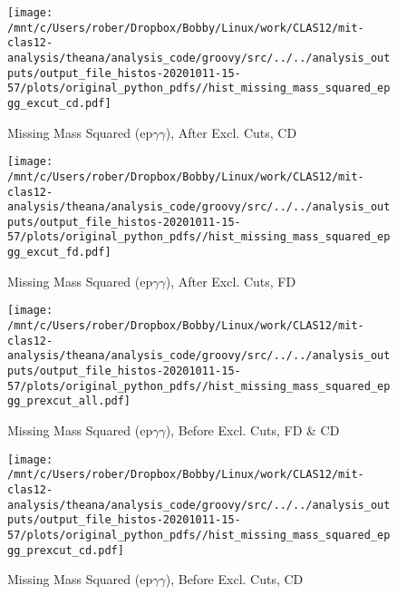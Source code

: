 \documentclass{article}
\begin{document}
\begin{landscape}
    \begin{figure}[h]
        \centering

        \texttt{[image: /mnt/c/Users/rober/Dropbox/Bobby/Linux/work/CLAS12/mit-clas12-analysis/theana/analysis\_code/groovy/src/../../analysis\_outputs/output\_file\_histos-20201011-15-57/plots/original\_python\_pdfs//hist\_missing\_mass\_squared\_epgg\_excut\_cd.pdf]}
        \captionsetup{textformat=empty,labelformat=blank}
        \caption{Missing Mass Squared (ep$\gamma$$\gamma$), After Excl. Cuts, CD}
    \end{figure}
    \clearpage
    
    \begin{figure}[h]
        \centering

        \texttt{[image: /mnt/c/Users/rober/Dropbox/Bobby/Linux/work/CLAS12/mit-clas12-analysis/theana/analysis\_code/groovy/src/../../analysis\_outputs/output\_file\_histos-20201011-15-57/plots/original\_python\_pdfs//hist\_missing\_mass\_squared\_epgg\_excut\_fd.pdf]}
        \captionsetup{textformat=empty,labelformat=blank}
        \caption{Missing Mass Squared (ep$\gamma$$\gamma$), After Excl. Cuts, FD}
    \end{figure}
    \clearpage
    
    \begin{figure}[h]
        \centering

        \texttt{[image: /mnt/c/Users/rober/Dropbox/Bobby/Linux/work/CLAS12/mit-clas12-analysis/theana/analysis\_code/groovy/src/../../analysis\_outputs/output\_file\_histos-20201011-15-57/plots/original\_python\_pdfs//hist\_missing\_mass\_squared\_epgg\_prexcut\_all.pdf]}
        \captionsetup{textformat=empty,labelformat=blank}
        \caption{Missing Mass Squared (ep$\gamma$$\gamma$), Before Excl. Cuts, FD \& CD}
    \end{figure}
    \clearpage
    
    \begin{figure}[h]
        \centering

        \texttt{[image: /mnt/c/Users/rober/Dropbox/Bobby/Linux/work/CLAS12/mit-clas12-analysis/theana/analysis\_code/groovy/src/../../analysis\_outputs/output\_file\_histos-20201011-15-57/plots/original\_python\_pdfs//hist\_missing\_mass\_squared\_epgg\_prexcut\_cd.pdf]}
        \captionsetup{textformat=empty,labelformat=blank}
        \caption{Missing Mass Squared (ep$\gamma$$\gamma$), Before Excl. Cuts, CD}
    \end{figure}
    \clearpage
    

\end{landscape}
\end{document}
